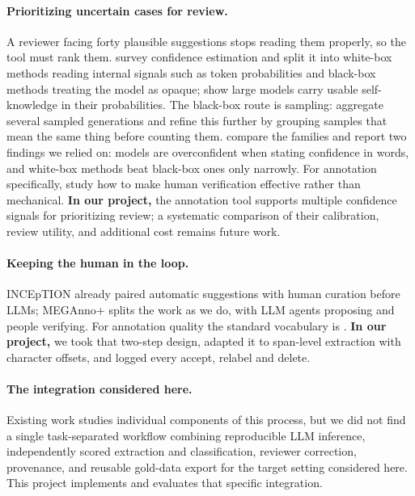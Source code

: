 \paragraph{Prioritizing uncertain cases for review.}
A reviewer facing forty plausible suggestions stops reading them properly, so
the tool must rank them. \citet{geng2024survey} survey confidence estimation
and split it into white-box methods reading internal signals such as token
probabilities and black-box methods treating the model as opaque;
\citet{kadavath2022know} show large models carry usable self-knowledge in their
probabilities. The black-box route is sampling: \citet{wang2023selfconsistency}
aggregate several sampled generations and \citet{kuhn2023semantic} refine this
further by grouping samples that mean the same thing before counting them.
\citet{xiong2024express} compare the families and report two findings we relied
on: models are overconfident when stating confidence in words, and white-box
methods beat black-box ones only narrowly. For annotation specifically,
\citet{wang2024collaborative} study how to make human verification effective
rather than mechanical.
\textbf{In our project,} the annotation tool supports multiple confidence
signals for prioritizing review; a systematic comparison of their calibration,
review utility, and additional cost remains future work.

\paragraph{Keeping the human in the loop.}
INCEpTION \citep{klie2018inception} already paired automatic suggestions with
human curation before LLMs; MEGAnno+ \citep{kim2024meganno} splits the work as
we do, with LLM agents proposing and people verifying. For annotation quality
the standard vocabulary is \citet{artstein2008intercoder}.
\textbf{In our project,} we took that two-step design, adapted it to span-level
extraction with character offsets, and logged every accept, relabel and
delete.

\paragraph{The integration considered here.}
Existing work studies individual components of this process, but we did not
find a single task-separated workflow combining reproducible LLM inference,
independently scored extraction and classification, reviewer correction,
provenance, and reusable gold-data export for the target setting considered
here. This project implements and evaluates that specific integration.
